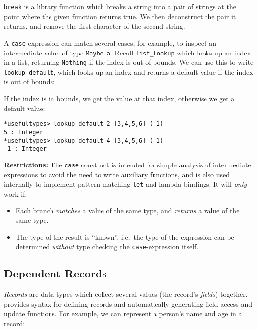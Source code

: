 
\noindent
\texttt{break} is a library function which breaks a string into a pair of strings
at the point where the given function returns true.
We then deconstruct the pair it returns, and remove the first character of the second string.

A \texttt{case} expression can match several cases, for example, to inspect an intermediate value of type \texttt{Maybe a}.
Recall \texttt{list\_lookup} which looks up an index in a list, returning \texttt{Nothing} if the index is out
of bounds.
We can use this to write \texttt{lookup\_default}, which looks up an index and returns a default value if the index is out of bounds:


\noindent
If the index is in bounds, we get the value at that index, otherwise we get a default value:

\begin{lstlisting}[style=stdout]
*usefultypes> lookup_default 2 [3,4,5,6] (-1)
5 : Integer
*usefultypes> lookup_default 4 [3,4,5,6] (-1)
-1 : Integer
\end{lstlisting}
 

\noindent
\textbf{Restrictions:} The \texttt{case} construct is intended for simple analysis of intermediate expressions to avoid the need to write auxiliary functions, and is also used internally to implement pattern matching \texttt{let} and lambda bindings. 
It will \emph{only} work if:

\begin{itemize}
\item Each branch \emph{matches} a value of the same type, and \emph{returns} a value of the same type.
\item The type of the result is ``known''. i.e.\ the type of the expression can be determined \emph{without} type checking the \texttt{case}-expression itself. 
\end{itemize}

\subsection{Dependent Records}

\emph{Records} are data types which collect several values (the record's \emph{fields}) together.
\Idris{} provides syntax for defining records and automatically generating field access and update functions.
For example, we can represent a person's name and age in a record:

